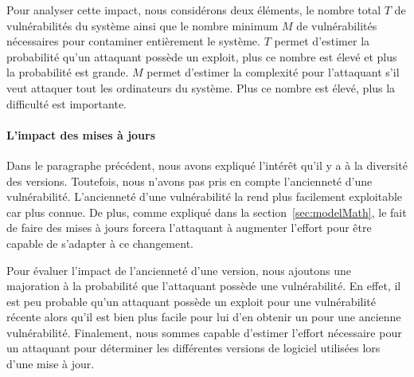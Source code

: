 Pour analyser cette impact, nous considérons deux éléments, le nombre total $T$ de vulnérabilités du système ainsi que le nombre minimum $M$ de vulnérabilités nécessaires pour contaminer entièrement le système.
$T$ permet d'estimer la probabilité qu'un attaquant possède un exploit, plus ce nombre est élevé et plus la probabilité est grande.
$M$ permet d'estimer la complexité pour l'attaquant s'il veut attaquer tout les ordinateurs du système.
Plus ce nombre est élevé, plus la difficulté est importante.

\paragraph{L'impact des mises à jours}
Dans le paragraphe précédent, nous avons expliqué l'intérêt qu'il y a à la diversité des versions.
Toutefois, nous n'avons pas pris en compte l'ancienneté d'une vulnérabilité. 
L'ancienneté d'une vulnérabilité la rend plus facilement exploitable car plus connue.
De plus, comme expliqué dans la section~\ref{sec:modelMath}, le fait de faire des mises à jours forcera l'attaquant à augmenter l'effort pour être capable de s'adapter à ce changement.

Pour évaluer l'impact de l'ancienneté d'une version, nous ajoutons une majoration à la probabilité que l'attaquant possède une vulnérabilité.
En effet, il est peu probable qu'un attaquant possède un exploit pour une vulnérabilité récente alors qu'il est bien plus facile pour lui d'en obtenir un pour une ancienne vulnérabilité.
Finalement, nous sommes capable d'estimer l'effort nécessaire pour un attaquant pour déterminer les différentes versions de logiciel utilisées lors d'une mise à jour.

